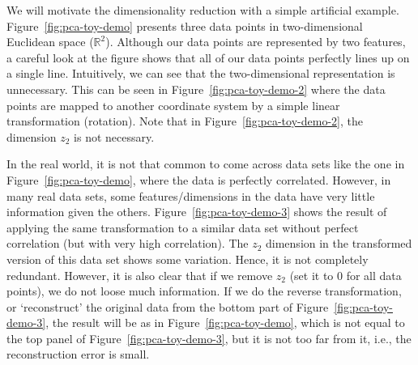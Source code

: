 We will motivate the dimensionality reduction
with a simple artificial example.
Figure~\ref{fig:pca-toy-demo} presents three data points
in two-dimensional Euclidean space ($\mathbb{R}^{2}$).
Although our data points are represented by two features,
a careful look at the figure shows that
all of our data points perfectly lines up on a single line.
Intuitively,
we can see that the two-dimensional representation is unnecessary.
This can be seen in Figure~\ref{fig:pca-toy-demo-2}
where the data points are mapped to another coordinate system
by a simple linear transformation (rotation).
Note that in Figure~\ref{fig:pca-toy-demo-2},
the dimension $z_{2}$ is not necessary.

\begin{marginfigure}[-10\baselineskip]
  \caption{\label{fig:pca-toy-demo-2}%
    A transformation (rotation) applied to the data
    in Figure~\ref{fig:pca-toy-demo}.
  }
\end{marginfigure}

In the real world,
it is not that common to come across data sets like the one in
Figure~\ref{fig:pca-toy-demo},
where the data is perfectly correlated.
However, in many real data sets,
some features/dimensions in the data 
have very little information given the others.
Figure~\ref{fig:pca-toy-demo-3} shows the result of applying
the same transformation to a similar data set without perfect correlation
(but with very high correlation).
The $z_{2}$ dimension in the transformed version
of this data set shows some variation.
Hence, it is not completely redundant.
However, it is also clear that if we remove $z_{2}$
(set it to \num{0} for all data points),
we do not loose much information.
If we do the reverse transformation,
or `reconstruct' the original data
from the bottom part of Figure~\ref{fig:pca-toy-demo-3},
the result will be as in Figure~\ref{fig:pca-toy-demo},
which is not equal to the top panel of Figure~\ref{fig:pca-toy-demo-3},
but it is not too far from it,
i.e., the reconstruction error is small.

